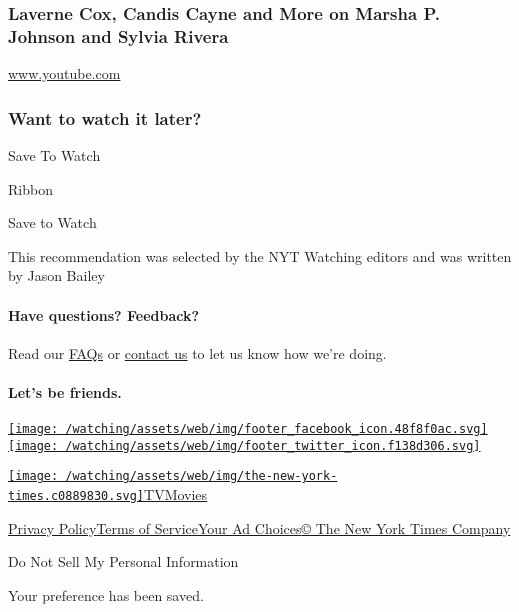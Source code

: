 \hypertarget{laverne-cox-candis-cayne-and-more-on-marsha-p-johnson-and-sylvia-rivera}{%
\subsubsection{Laverne Cox, Candis Cayne and More on Marsha P. Johnson
and Sylvia
Rivera}\label{laverne-cox-candis-cayne-and-more-on-marsha-p-johnson-and-sylvia-rivera}}

\href{http://www.youtube.com}{www.youtube.com}

\hypertarget{want-to-watch-it-later}{%
\subsubsection{Want to watch it later?}\label{want-to-watch-it-later}}

Save To Watch

Ribbon

Save to Watch

This recommendation was selected by the NYT Watching editors and was
written by Jason Bailey

\hypertarget{have-questions-feedback}{%
\paragraph{Have questions? Feedback?}\label{have-questions-feedback}}

Read our \href{//www.nytimes.com/2017/01/10/watching/faq.html}{FAQs} or
\href{mailto:watchingcare@nytimes.com}{contact us} to let us know how
we're doing.

\hypertarget{lets-be-friends}{%
\paragraph{Let's be friends.}\label{lets-be-friends}}

\href{https://www.facebook.com/nytwatching/}{\texttt{[image: /watching/assets/web/img/footer\_facebook\_icon.48f8f0ac.svg]}}\href{https://twitter.com/watching}{\texttt{[image: /watching/assets/web/img/footer\_twitter\_icon.f138d306.svg]}}

\href{//www.nytimes.com}{\texttt{[image: /watching/assets/web/img/the-new-york-times.c0889830.svg]}}\href{//www.nytimes.com/section/arts/television}{TV}\href{//www.nytimes.com/section/movies}{Movies}

\href{//www.nytimes.com/content/help/rights/privacy/policy/privacy-policy.html}{Privacy
Policy}\href{//www.nytimes.com/content/help/rights/terms/terms-of-service.html}{Terms
of
Service}\href{//www.nytimes.com/content/help/rights/privacy/policy/privacy-policy.html\#pp}{Your
Ad Choices}\href{http://www.nytco.com/}{© The New York Times Company}

Do Not Sell My Personal Information

Your preference has been saved.
